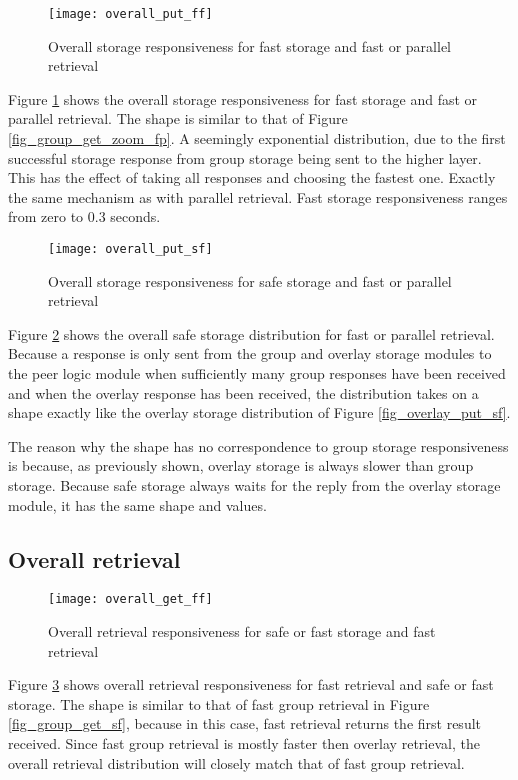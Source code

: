 \begin{figure}[htbp]
 \centering
 \texttt{[image: overall\_put\_ff]}
 \caption{Overall storage responsiveness for fast storage and fast or parallel retrieval}
 \label{fig_overall_put_ff}
\end{figure}
%
Figure \ref{fig_overall_put_ff} shows the overall storage responsiveness for fast storage and fast or parallel retrieval. The shape is similar to that of Figure \ref{fig_group_get_zoom_fp}. A seemingly exponential distribution, due to the first successful storage response from group storage being sent to the higher layer. This has the effect of taking all responses and choosing the fastest one. Exactly the same mechanism as with parallel retrieval. Fast storage responsiveness ranges from zero to 0.3 seconds.

\begin{figure}[htbp]
 \centering
 \texttt{[image: overall\_put\_sf]}
 \caption{Overall storage responsiveness for safe storage and fast or parallel retrieval}
 \label{fig_overall_put_sf}
\end{figure}
%
Figure \ref{fig_overall_put_sf} shows the overall safe storage distribution for fast or parallel retrieval. Because a response is only sent from the group and overlay storage modules to the peer logic module when sufficiently many group responses have been received and when the overlay response has been received, the distribution takes on a shape exactly like the overlay storage distribution of Figure \ref{fig_overlay_put_sf}.

The reason why the shape has no correspondence to group storage responsiveness is because, as previously shown, overlay storage is always slower than group storage. Because safe storage always waits for the reply from the overlay storage module, it has the same shape and values.

\subsection{Overall retrieval}

\begin{figure}[htbp]
 \centering
 \texttt{[image: overall\_get\_ff]}
 \caption{Overall retrieval responsiveness for safe or fast storage and fast retrieval}
 \label{fig_overall_get_ff}
\end{figure}
%
Figure \ref{fig_overall_get_ff} shows overall retrieval responsiveness for fast retrieval and safe or fast storage. The shape is similar to that of fast group retrieval in Figure \ref{fig_group_get_sf}, because in this case, fast retrieval returns the first result received. Since fast group retrieval is mostly faster then overlay retrieval, the overall retrieval distribution will closely match that of fast group retrieval.

